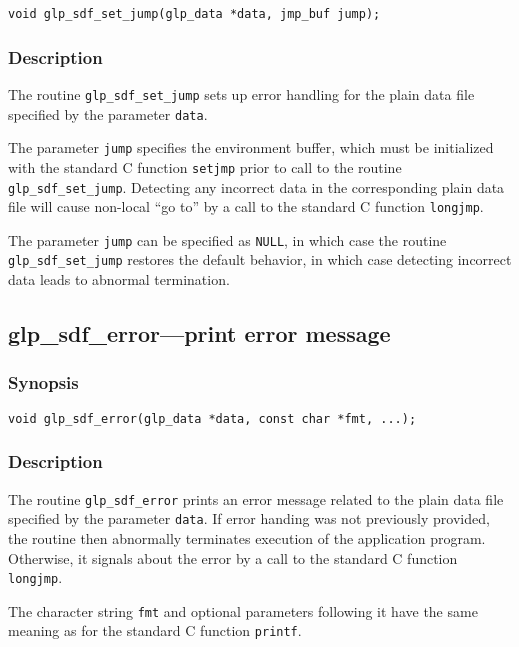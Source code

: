 \begin{verbatim}
void glp_sdf_set_jump(glp_data *data, jmp_buf jump);
\end{verbatim}

\subsubsection*{Description}

The routine \verb|glp_sdf_set_jump| sets up error handling for the
plain data file specified by the parameter \verb|data|.

The parameter \verb|jump| specifies the environment buffer, which must
be initialized with the standard C function \verb|setjmp| prior to call
to the routine \verb|glp_sdf_set_jump|. Detecting any incorrect data in
the corresponding plain data file will cause non-local ``go to'' by
a call to the standard C function \verb|longjmp|.

The parameter \verb|jump| can be specified as \verb|NULL|, in which
case the routine \verb|glp_sdf_set_jump| restores the default behavior,
in which case detecting incorrect data leads to abnormal termination.

\subsection{glp\_sdf\_error---print error message}

\subsubsection*{Synopsis}

\begin{verbatim}
void glp_sdf_error(glp_data *data, const char *fmt, ...);
\end{verbatim}

\subsubsection*{Description}

The routine \verb|glp_sdf_error| prints an error message related to the
plain data file specified by the parameter \verb|data|. If error handing
was not previously provided, the routine then abnormally terminates
execution of the application program. Otherwise, it signals about the
error by a call to the standard C function \verb|longjmp|.

The character string \verb|fmt| and optional parameters following it
have the same meaning as for the standard C function \verb|printf|.

